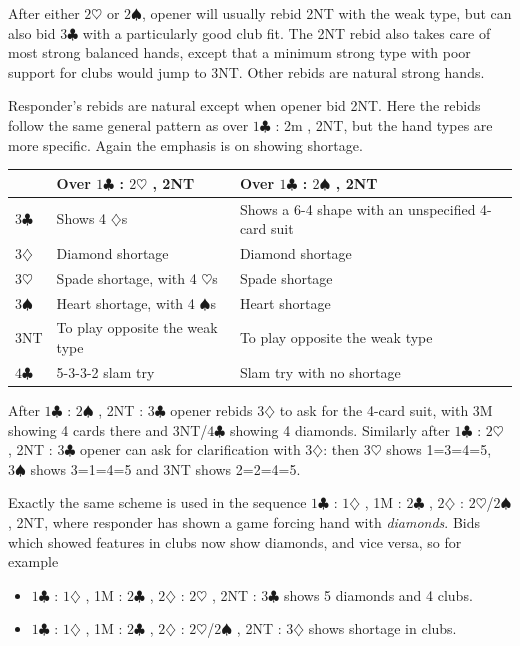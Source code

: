 \documentclass{article}
\newcommand{\sz}{\spadesuit}
\newcommand{\hz}{\heartsuit}
\newcommand{\dz}{\diamondsuit}
\newcommand{\cz}{\clubsuit}
\newcommand{\st}{\rule{0pt}{4mm}}
\begin{document}
After either $2\hz$ or $2\sz$, opener will usually rebid 2NT with the weak type, but can also bid $3\cz$ with a particularly good club fit. The 2NT rebid also takes care of most strong balanced hands, except that a minimum strong type with poor support for clubs would jump to 3NT. Other rebids are natural strong hands.

Responder's rebids are natural except when opener bid 2NT. Here the rebids follow the same general pattern as over $1\cz$ : 2m , 2NT, but the hand types are more specific. Again the emphasis is on showing shortage.

\begin{center}
\begin{tabular}{|l|p{4.5cm}|p{5cm}|} \hline
 & \st Over $1\cz$ : $2\hz$ , 2NT & Over $1\cz$ : $2\sz$ , 2NT \\ \hline
$3\cz$ & \st Shows 4 $\dz$s & Shows a 6-4 shape with an unspecified 4-card suit \\ \hline
$3\dz$ & \st Diamond shortage & Diamond shortage \\ \hline
$3\hz$ & \st Spade shortage, with 4 $\hz$s & Spade shortage \\ \hline
$3\sz$ & \st Heart shortage, with 4 $\sz$s & Heart shortage \\ \hline
3NT & \st To play opposite the weak type & To play opposite the weak type \\ \hline
$4\cz$ & 5-3-3-2 slam try \st & Slam try with no shortage \\ \hline
\end{tabular}
\end{center}
\vspace{3mm}
After $1\cz$ : $2\sz$ , 2NT : $3\cz$ opener rebids $3\dz$ to ask for the 4-card suit, with 3M showing 4 cards there and 3NT/$4\cz$ showing 4 diamonds. Similarly after $1\cz$ : $2\hz$ , 2NT : $3\cz$ opener can ask for clarification with $3\dz$: then $3\hz$ shows 1=3=4=5, $3\sz$ shows 3=1=4=5 and 3NT shows 2=2=4=5.

\vspace{4mm}
Exactly the same scheme is used in the sequence $1\cz$ : $1\dz$ , 1M : $2\cz$ , $2\dz$ : $2\hz$/$2\sz$ , 2NT, where responder has shown a game forcing hand with \emph{diamonds}. Bids which showed features in clubs now show diamonds, and vice versa, so for example
\begin{itemize}
\item $1\cz$ : $1\dz$ , 1M : $2\cz$ , $2\dz$ : $2\hz$ , 2NT : $3\cz$ shows 5 diamonds and 4 clubs.
\item $1\cz$ : $1\dz$ , 1M : $2\cz$ , $2\dz$ : $2\hz$/$2\sz$ , 2NT : $3\dz$ shows shortage in clubs.
\end{itemize}
\end{document}
